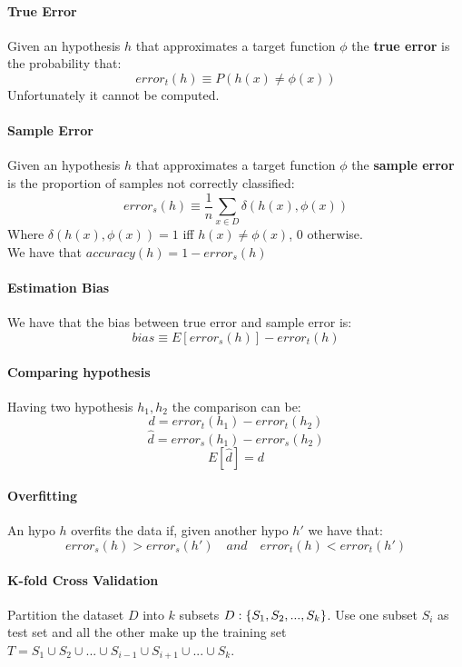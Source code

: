\paragraph{True Error}
Given an hypothesis $h$ that approximates a target function $\phi $ the \textbf{true error} is the probability that:
$$error_t(h) \equiv P(h(x)\neq \phi(x))$$
Unfortunately it cannot be computed.

\paragraph{Sample Error}
Given an hypothesis $h$ that approximates a target function $\phi $ the \textbf{sample error} is the proportion of samples not correctly classified:
\[error_s(h) \equiv \frac{1}{n} \sum_{x \in D} \delta(h(x), \phi(x))\]
Where $\delta(h(x), \phi(x))=1$ iff $h(x) \neq \phi(x)$, 0 otherwise.\\
We have that $accuracy(h)=1- error_s(h)$

\paragraph{Estimation Bias}
We have that the bias between true error and sample error is:
\[bias \equiv E[error_s(h)]-error_t(h)\]

\paragraph{Comparing hypothesis}
Having two hypothesis $h_1,h_2$ the comparison can be:
\[d= error_t(h_1)- error_t(h_2)\]
\[\hat{d}= error_s(h_1)- error_s(h_2)\]
\[E[\hat{d}]=d\]

\paragraph{Overfitting}
An hypo $h$ overfits the data if, given another hypo $h'$ we have that:
\[error_s(h)>error_s(h')\quad and\quad error_t(h)< error_t(h')\]


\paragraph{K-fold Cross Validation}
Partition the dataset $D$ into $k$ subsets $D: \lbrace{S_1,S_2,...,S_k}\rbrace$. Use one subset $S_i$ as test set and all the other make up the training set $T=S_1 \cup S_2 \cup...\cup S_{i-1}\cup S_{i+1}\cup ...\cup S_k$.\\

